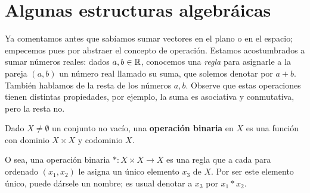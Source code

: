 \section{Algunas estructuras algebráicas}
Ya comentamos antes que sabíamos sumar vectores en el plano o 
en el espacio; empecemos pues por abstraer el 
concepto de operación. Estamos acostumbrados a sumar 
números reales: dados $a, b \in \mathbb{R}$, conocemos una
\textit{regla} para asignarle a la pareja $(a, b)$
un número real llamado su suma, que solemos denotar por $a+b$.
También hablamos de la resta de los números $a, b$.
Observe que estas operaciones tienen distintas propiedades, por
ejemplo, la suma es asociativa y conmutativa, pero
la resta no. 
\begin{defi}
Dado $X \neq \emptyset$ un conjunto no vacío, una
\textbf{operación binaria} en $X$ es una función con dominio
$X \times X$ y codominio $X$.
\end{defi}
O sea, una operación binaria $*: X \times X \longrightarrow X$ 
es una regla que a cada para ordenado $(x_{1}, x_{2})$ le asigna
un único elemento $x_{3}$ de $X$. Por ser este elemento único,
puede dársele un nombre; es usual denotar a $x_{3}$
por $x_{1} * x_{2}$.

